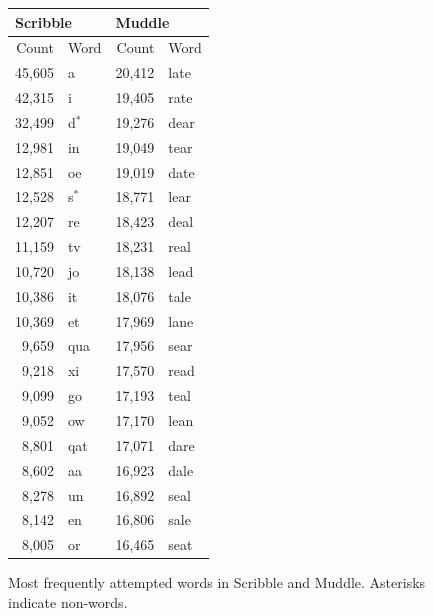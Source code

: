 \documentclass[twocolumn]{article}
\begin{document}
\begin{figure}
\begin{center}
\begin{tabular}{|rl@{\qquad}rl|}
\multicolumn{2}{l}{{\bf \large Scribble}} &
\multicolumn{2}{l}{{\bf \large Muddle}} \\
\hline
Count & Word & Count & Word \\
\hline
45,605  &  a        &     20,412  &  late  \\
42,315  &  i        &     19,405  &  rate  \\
32,499  &  d$^*$    &     19,276  &  dear  \\
12,981  &  in       &     19,049  &  tear  \\
12,851  &  oe       &     19,019  &  date  \\
12,528  &  s$^*$    &     18,771  &  lear  \\
12,207  &  re       &     18,423  &  deal  \\
11,159  &  tv       &     18,231  &  real  \\
10,720  &  jo       &     18,138  &  lead  \\
10,386  &  it       &     18,076  &  tale  \\
10,369  &  et       &     17,969  &  lane  \\
9,659   &  qua      &     17,956  &  sear  \\
9,218   &  xi       &     17,570  &  read  \\
9,099   &  go       &     17,193  &  teal  \\
9,052   &  ow       &     17,170  &  lean  \\
8,801   &  qat      &     17,071  &  dare  \\
8,602   &  aa       &     16,923  &  dale  \\
8,278   &  un       &     16,892  &  seal  \\
8,142   &  en       &     16,806  &  sale  \\
8,005   &  or       &     16,465  &  seat  \\
\hline
\end{tabular}
\end{center}
\caption{Most frequently attempted words in Scribble and Muddle. Asterisks
indicate non-words.}
\label{fig:mostfrequent}
\end{figure}
\end{document}
